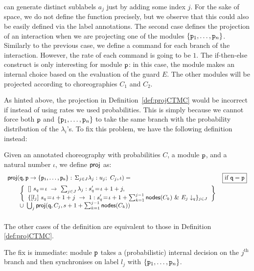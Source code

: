     can generate distinct sublabels $a_j$ just by adding some index
    $j$. For the sake of space, we do not define the function
    precisely, but we observe that this could also be easily defined
    via the label annotations. The second case defines the projection
    of an interaction when we are projecting one of the modules
    $\{\mathtt{p}_1,\ldots,\mathtt{p}_n\}$. Similarly to the previous case,
    we define a command for each branch of the interaction. However,
    the rate of each command is going to be $1$. The if-then-else
    construct is only interesting for module $\mathtt{p}$: in this case,
    the module makes an internal choice based on the evaluation of the
    guard $E$. The other modules will be projected according to
    choreographies $C_1$ and $C_2$.

    As hinted above, the projection in Definition~\ref{def:projCTMC}
    would be incorrect if instead of using rates we used
    probabilities. This is simply because we cannot force both
    $\mathtt{p}$ and $\{\mathtt{p}_1,\ldots,\mathtt{p}_n\}$ to take the same
    branch with the probability distribution of the $\lambda_i$'s. To fix this problem, we have the following definition
    instead:
    \begin{definition}\label{def:projDTMC} Given an annotated
      choreography with probabilities $C$, a module $\mathtt{p}$, and a
      natural number $\iota$, we define $\mathsf{proj}$ as:
      \begin{displaymath}\small
        \begin{array}{lr}

          \proj (\role q,\interact{p}{\role p_1,\ldots,\role p_n}, \iota)= 
          &  \boxed{\text{if }\role q=\role p}\\[2mm]
          \qquad
          \left\{
          \begin{array}{lll}
            \commandBase {} {s_{q}\!=\! \iota}{\ \sum_{j\in J} \lambda_j: s'_{q}\!=\! \iota+1+j},\\ 
            \{\commandBase {l_j} {s_{q}\!=\! \iota+1+j}
            \ 1: s'_{q}\!=\! \iota+1+\sum_{k=1}^{j-1}\mathsf{nodes}({C_k})\ \&\ \projE
            {E_j}q\}_{j\in J}
          \end{array}
          \right\}
          \\
          \qquad\cup\ \bigcup_{j} \proj (\role q, C_j, s+1+\sum_{k=1}^{j-1}\mathsf{nodes}({C_k}))
          \\\\

        \end{array}
      \end{displaymath}
      The other cases of the definition are equivalent to those in
      Definition \ref{def:projCTMC}.
    \end{definition}
    The fix is immediate: module $\mathtt{p}$ takes a (probabilistic)
    internal decision on the $j^{\text{th}}$ branch and then
    synchronises on label $l_j$ with $\{\mathtt{p}_1,\ldots,\mathtt{p}_n\}$.       


